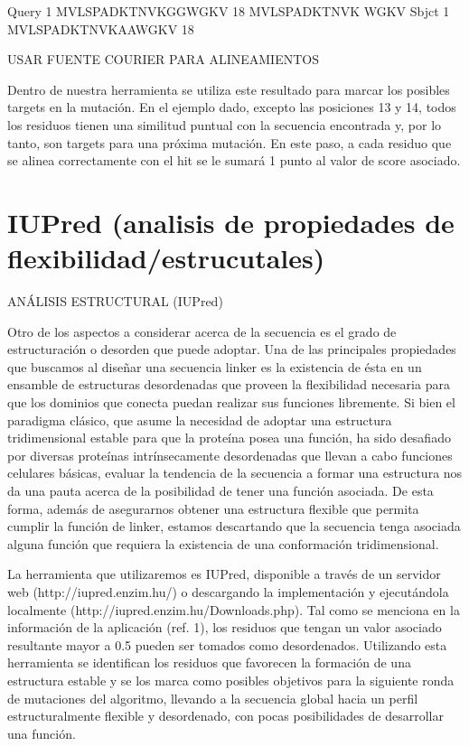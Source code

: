 Query  1   MVLSPADKTNVKGGWGKV  18
           MVLSPADKTNVK  WGKV
Sbjct  1   MVLSPADKTNVKAAWGKV  18

USAR FUENTE COURIER PARA ALINEAMIENTOS

Dentro de nuestra herramienta se utiliza este resultado para marcar los posibles targets en la mutación. En el ejemplo dado, excepto las posiciones 13 y 14, todos los residuos tienen una similitud puntual con la secuencia encontrada y, por lo tanto, son targets para una próxima mutación.
En este paso, a cada residuo que se alinea correctamente con el hit se le sumará 1 punto al valor de score asociado.





\section{IUPred (analisis de propiedades de flexibilidad/estrucutales)}
ANÁLISIS ESTRUCTURAL (IUPred)

Otro de los aspectos a considerar acerca de la secuencia es el grado de estructuración o desorden que puede adoptar. 
Una de las principales propiedades que buscamos al diseñar una secuencia linker es la existencia de ésta en un ensamble
de estructuras desordenadas que proveen la flexibilidad necesaria para que los dominios que conecta puedan realizar sus funciones libremente.
Si bien el paradigma clásico, que asume la necesidad de adoptar una estructura tridimensional estable para que la proteína posea una función,
ha sido desafiado por diversas proteínas intrínsecamente desordenadas que llevan a cabo funciones celulares básicas, 
evaluar la tendencia de la secuencia a formar una estructura nos da una pauta acerca de la posibilidad de tener una función asociada. 
De esta forma, además de asegurarnos obtener una estructura flexible que permita cumplir la función de linker, 
estamos descartando que la secuencia tenga asociada alguna función que requiera la existencia de una conformación tridimensional.

La herramienta que utilizaremos es IUPred, disponible a través de un servidor web (http://iupred.enzim.hu/) o descargando la implementación 
y ejecutándola localmente (http://iupred.enzim.hu/Downloads.php).   
Tal como se menciona en la información de la aplicación (ref. 1), los residuos que tengan un valor asociado resultante mayor a 0.5 pueden ser tomados como desordenados.
Utilizando esta herramienta se identifican los residuos que favorecen la formación de una estructura estable 
y se los marca como posibles objetivos para la siguiente ronda de mutaciones del algoritmo, llevando a la secuencia 
global hacia un perfil estructuralmente flexible y desordenado, con pocas posibilidades de desarrollar una función.


